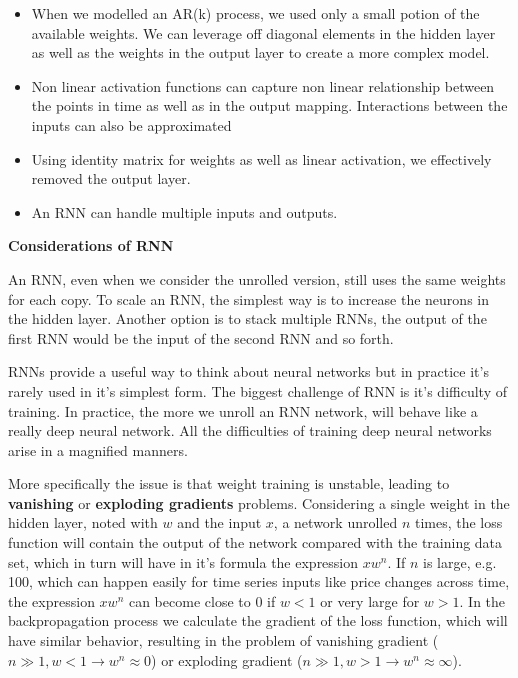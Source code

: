 \begin{itemize}
    \item When we modelled an AR(k) process, we used only a small potion of the available weights. We can leverage off diagonal elements in the hidden layer as well as the weights in the output layer to create a more complex model.
    \item Non linear activation functions can capture non linear relationship between the points in time as well as in the output mapping. Interactions between the inputs can also be approximated
    \item Using identity matrix for weights as well as linear activation, we effectively removed the output layer.
    \item An RNN can handle multiple inputs and outputs.
\end{itemize}

\textbf{Considerations of RNN}

An RNN, even when we consider the unrolled version, still uses the same weights for each copy. To scale an RNN, the simplest way is to increase the neurons in the hidden layer. Another option is to stack multiple RNNs, the output of the first RNN would be the input of the second RNN and so forth.

RNNs provide a useful way to think about neural networks but in practice it's rarely used in it's simplest form. The biggest challenge of RNN is it's difficulty of training. In practice, the more we unroll an RNN network, will behave like a really deep neural network. All the difficulties of training deep neural networks arise in a magnified manners.

More specifically the issue is that weight training is unstable, leading to \textbf{vanishing} or \textbf{exploding gradients} problems. Considering a single weight in the hidden layer, noted with \(w\) and the input \(x\), a network unrolled \(n\) times, the loss function will contain the output of the network compared with the training data set, which in turn will have in it's formula the expression \(x w^n\). If \(n\) is large, e.g. 100, which can happen easily for time series inputs like price changes across time, the expression \(x w^n\) can become close to \(0\) if \(w < 1\) or very large for \(w > 1\). In the backpropagation process we calculate the gradient of the loss function, which will have similar behavior, resulting in the problem of vanishing gradient (\(n \gg 1, w < 1 \rightarrow w^n \approx 0\)) or exploding gradient (\(n \gg 1, w > 1 \rightarrow w^n \approx \infty\)).

